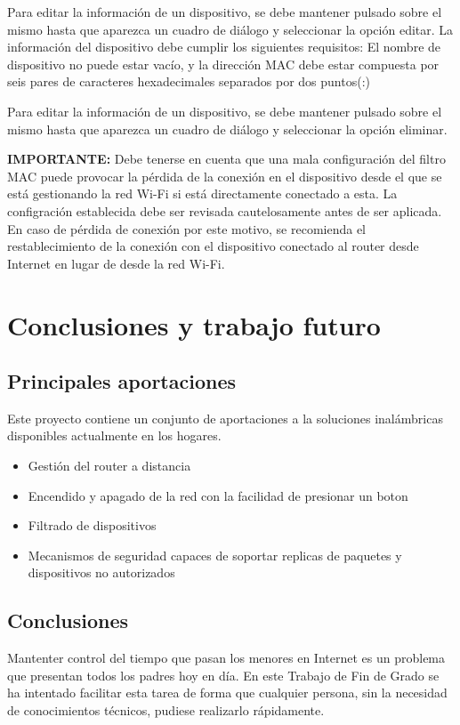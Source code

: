 \documentclass[12pt]{article}
\begin{document}
        Para editar la información de un dispositivo, se debe mantener pulsado sobre el mismo hasta que aparezca un cuadro de diálogo y seleccionar la opción editar. La información del dispositivo debe cumplir los siguientes requisitos: El nombre de dispositivo no puede estar vacío, y la dirección MAC debe estar compuesta por seis pares de caracteres hexadecimales separados por dos puntos(:)

        Para editar la información de un dispositivo, se debe mantener pulsado sobre el mismo hasta que aparezca un cuadro de diálogo y seleccionar la opción eliminar.

        \textbf{IMPORTANTE:} Debe tenerse en cuenta que una mala configuración del filtro MAC puede provocar la pérdida de la conexión en el dispositivo desde el que se está gestionando la red Wi-Fi si está directamente conectado a esta. La configración establecida debe ser revisada cautelosamente antes de ser aplicada. En caso de pérdida de conexión por este motivo, se recomienda el restablecimiento de la conexión con el dispositivo conectado al router desde Internet en lugar de desde la red Wi-Fi.

\section{Conclusiones y trabajo futuro} \label{sec:conc}
    \subsection{Principales aportaciones}
    Este proyecto contiene un conjunto de aportaciones a la soluciones inalámbricas disponibles actualmente en los hogares.
    
    \begin{itemize}
        \item Gestión del router a distancia
        \item Encendido y apagado de la red con la facilidad de presionar un boton
        \item Filtrado de dispositivos
        \item Mecanismos de seguridad capaces de soportar replicas de paquetes y dispositivos no autorizados
    \end{itemize}
    
    \subsection{Conclusiones}
    Mantenter control del tiempo que pasan los menores en Internet es un problema que presentan todos los padres hoy en día. En este Trabajo de Fin de Grado se ha intentado facilitar esta tarea de forma que cualquier persona, sin la necesidad de conocimientos técnicos, pudiese realizarlo rápidamente. 
    
\end{document}
